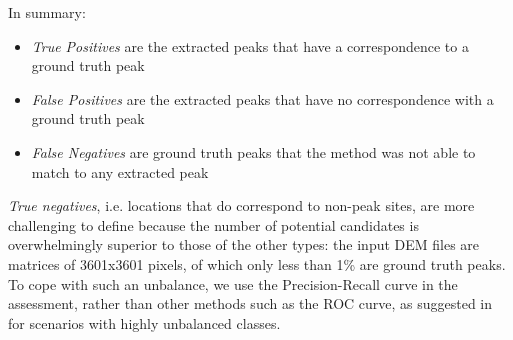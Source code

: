 
In summary:
\begin{itemize}
\item \textit{True Positives} are the extracted peaks that have a correspondence to a ground truth peak
\item \textit{False Positives} are the extracted peaks that  have no correspondence with a ground truth peak
\item \textit{False Negatives} are ground truth peaks that the method was not able to match to any extracted peak
\end{itemize}
\textit{True negatives}, i.e. locations that do correspond to non-peak sites, are more challenging to define because the number of potential candidates is overwhelmingly superior to those of the other types: the input DEM files are matrices of 3601x3601 pixels, of which only less than  1\%  are ground truth peaks.  To cope with such an unbalance, we  use the Precision-Recall curve in the assessment, rather than  other methods such as the ROC curve, as suggested in \cite{saito2015precision} for  scenarios with highly unbalanced classes.

